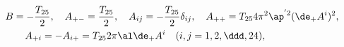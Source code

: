 \begin{equation}
\begin{split}
&B=-\frac{T_{25}}{2},\quad
A_{+-}=\frac{T_{25}}{2},\quad A_{ij}=-\frac{T_{25}}{2}\delta_{ij}
,\quad A_{++}=T_{25}4\pi^2 \ap^{'2}(\de_{+}A^i )^2, \\& \qquad 
A_{+i}=-A_{i+}=T_{25}2\pi\al\de_{+}A^i\ \ \ (i,j=1,2,\ddd,24),
\end{split}
\end{equation}

